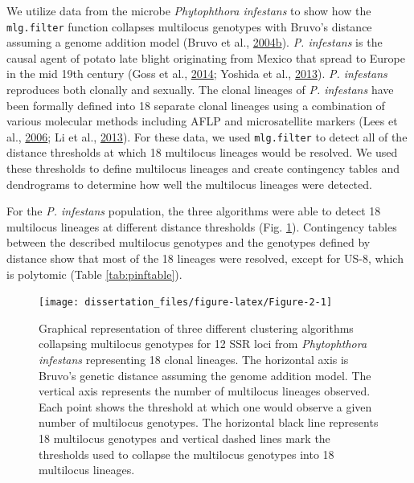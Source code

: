 \documentclass[double,12pt]{beavtex}
\begin{document}
  We utilize data from the microbe \emph{Phytophthora infestans} to show
  how the \texttt{mlg.filter} function collapses multilocus genotypes with
  Bruvo's distance assuming a genome addition model (Bruvo et al.,
  \protect\hyperlink{ref-bruvo2004simple}{2004}\protect\hyperlink{ref-bruvo2004simple}{b}).
  \emph{P. infestans} is the causal agent of potato late blight
  originating from Mexico that spread to Europe in the mid 19th century
  (Goss et al., \protect\hyperlink{ref-goss2014irish}{2014}; Yoshida et
  al., \protect\hyperlink{ref-yoshida2013rise}{2013}). \emph{P. infestans}
  reproduces both clonally and sexually. The clonal lineages of \emph{P.
  infestans} have been formally defined into 18 separate clonal lineages
  using a combination of various molecular methods including AFLP and
  microsatellite markers (Lees et al.,
  \protect\hyperlink{ref-lees2006novel}{2006}; Li et al.,
  \protect\hyperlink{ref-li2013efficient}{2013}). For these data, we used
  \texttt{mlg.filter} to detect all of the distance thresholds at which 18
  multilocus lineages would be resolved. We used these thresholds to
  define multilocus lineages and create contingency tables and dendrograms
  to determine how well the multilocus lineages were detected.
  
  For the \emph{P. infestans} population, the three algorithms were able
  to detect 18 multilocus lineages at different distance thresholds (Fig.
  \ref{fig:Figure-2}). Contingency tables between the described multilocus
  genotypes and the genotypes defined by distance show that most of the 18
  lineages were resolved, except for US-8, which is polytomic (Table
  \ref{tab:pinftable}).
  
  \begin{figure}
  
  {\centering \texttt{[image: dissertation\_files/figure-latex/Figure-2-1]} 
  
  }
  
  \caption[Graphical representation of three different clustering algorithms
  collapsing multilocus genotypes for 12 SSR loci from \emph{Phytophthora
  infestans} representing 18 clonal lineages.]{Graphical representation of three different clustering algorithms
  collapsing multilocus genotypes for 12 SSR loci from \emph{Phytophthora
  infestans} representing 18 clonal lineages. The horizontal axis is
  Bruvo's genetic distance assuming the genome addition model. The
  vertical axis represents the number of multilocus lineages observed.
  Each point shows the threshold at which one would observe a given number
  of multilocus genotypes. The horizontal black line represents 18
  multilocus genotypes and vertical dashed lines mark the thresholds used
  to collapse the multilocus genotypes into 18 multilocus lineages.}\label{fig:Figure-2}
  \end{figure}
  
\end{document}
